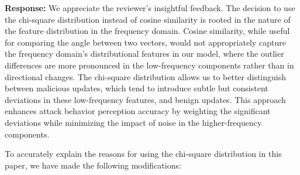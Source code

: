 \documentclass[a4paper,twoside,11pt,dvipsnames]{reviewresponse}
\begin{document}
\textbf{Response:} 
We appreciate the reviewer’s insightful feedback. The decision to use the chi-square distribution instead of cosine similarity is rooted in the nature of the feature distribution in the frequency domain. Cosine similarity, while useful for comparing the angle between two vectors, would not appropriately capture the frequency domain’s distributional features in our model, where the outlier differences are more pronounced in the low-frequency components rather than in directional changes. The chi-square distribution allows us to better distinguish between malicious updates, which tend to introduce subtle but consistent deviations in these low-frequency features, and benign updates. This approach enhances attack behavior perception accuracy by weighting the significant deviations while minimizing the impact of noise in the higher-frequency components. 

To accurately explain the reasons for using the chi-square distribution in this paper, we have made the following modifications:
\end{document}
